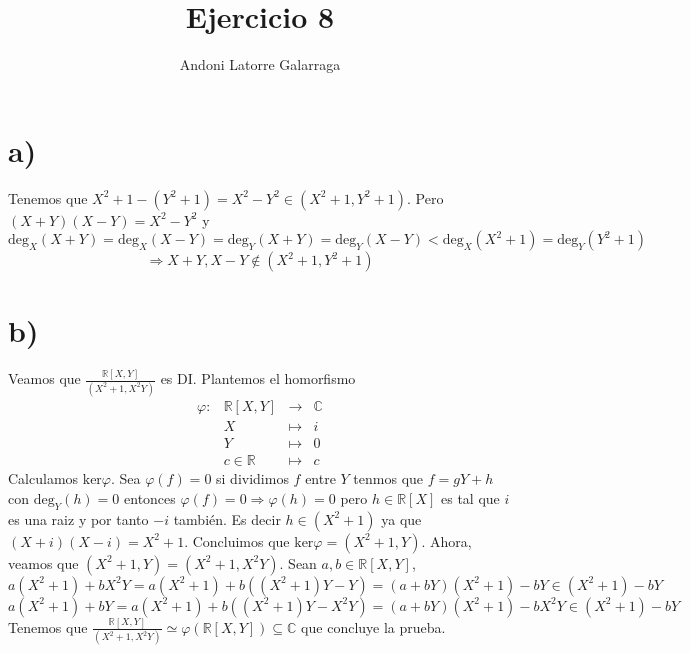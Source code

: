 \documentclass{article}
\title{Ejercicio 8}
\author{Andoni Latorre Galarraga}
\date{}
\newcommand{\bb}[1]{\mathbb{#1}}
\newcommand{\R}{\mathbb{R}}
\begin{document}
\maketitle

\section*{a)}

Tenemos que $X^2 + 1 - (Y^2 + 1) = X^2 - Y^2 \in (X^2 + 1, Y^2 + 1)$. Pero $(X + Y)(X - Y) = X^2 - Y^2$ y
$$
\text{deg}_X(X + Y) = \text{deg}_X(X - Y) = \text{deg}_Y(X + Y) = \text{deg}_Y(X - Y) < \text{deg}_X(X^2 + 1) = \text{deg}_Y(Y^2 + 1)
$$
$$
\Rightarrow X + Y, X - Y \notin (X^2 + 1, Y^2 + 1)
$$

\section*{b)}

Veamos que $\frac{\R[X,Y]}{(X^2 + 1, X^2Y)}$ es DI. Plantemos el homorfismo
$$
\begin{array}{crcl}
\varphi : & \R[X,Y] & \longrightarrow &  \bb{C} \\
& X & \longmapsto & i \\
& Y & \longmapsto & 0 \\
& c \in \R & \mapsto & c
\end{array}
$$
Calculamos $\text{ker}\varphi$. Sea $\varphi(f) = 0$ si dividimos $f$ entre $Y$ tenmos que $f = g Y + h$ con $\text{deg}_Y(h) = 0$ entonces $\varphi(f) = 0 \Rightarrow \varphi(h) = 0$ pero $h \in \R[X]$ es tal que $i$ es una raiz y por tanto $-i$ también. Es decir $h \in (X^2 + 1)$ ya que $(X+i)(X-i) = X^2 + 1$. Concluimos que $\text{ker}\varphi = (X^2 + 1, Y)$. Ahora, veamos que $(X^2 + 1, Y) = (X^2 + 1, X^2Y)$. Sean $a,b\in\R[X,Y]$,
$$
a (X^2+1) + b X^2 Y = a (X^2+1) + b ((X^2+1)Y - Y) = (a + bY) (X^2+1) - bY \in (X^2 + 1) - bY
$$
$$
a (X^2+1) + b Y = a (X^2+1) + b ((X^2+1)Y - X^2Y) = (a + bY) (X^2+1) - bX^2Y \in (X^2 + 1) - bY
$$
Tenemos que $\frac{\R[X,Y]}{(X^2 + 1, X^2Y)} \simeq \varphi(\R[X,Y]) \subseteq \bb{C}$ que concluye la prueba.
\end{document}
